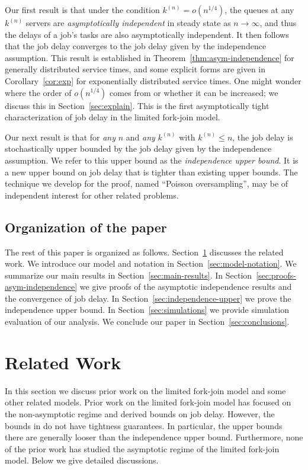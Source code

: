 \documentclass[sigconf]{acmart}
\newcommand{\supn}{^{(n)}}
\begin{document}
Our first result is that under the condition $k\supn=o(n^{1/4})$, the queues at any $k\supn$ servers are \emph{asymptotically independent} in steady state as $n\to\infty$, and thus the delays of a job's tasks are also asymptotically independent.  It then follows that the job delay converges to the job delay given by the independence assumption.  This result is established in Theorem~\ref{thm:asym-independence} for generally distributed service times, and some explicit forms are given in Corollary~\ref{cor:exp} for exponentially distributed service times.  One might wonder where the order of $o(n^{1/4})$ comes from or whether it can be increased; we discuss this in Section~\ref{sec:explain}.  This is the first asymptotically tight characterization of job delay in the limited fork-join model.

Our next result is that for \emph{any} $n$ and \emph{any} $k\supn$ with $k\supn\le n$, the job delay is stochastically upper bounded by the job delay given by the independence assumption.  We refer to this upper bound as the \emph{independence upper bound}.  It is a new upper bound on job delay that is tighter than existing upper bounds.  The technique we develop for the proof, named ``Poisson oversampling'', may be of independent interest for other related problems.


\subsection*{\normalsize{Organization of the paper}}
The rest of this paper is organized as follows. Section~\ref{sec:related-work} discusses the related work. We introduce our model and notation in Section~\ref{sec:model-notation}. We summarize our main results in Section~\ref{sec:main-results}. In Section~\ref{sec:proofs-asym-independence} we give proofs of the asymptotic independence results and the convergence of job delay. In Section~\ref{sec:independence-upper} we prove the independence upper bound. In Section~\ref{sec:simulations} we provide simulation evaluation of our analysis. We conclude our paper in Section~\ref{sec:conclusions}.


\section{Related Work}\label{sec:related-work}
In this section we discuss prior work on the limited fork-join model and some other related models.  Prior work on the limited fork-join model \cite{RizPolCiu_16,LeeShaHua_17} has focused on the non-asymptotic regime and derived bounds on job delay.  However, the bounds in \cite{RizPolCiu_16,LeeShaHua_17} do not have tightness guarantees.  In particular, the upper bounds there are generally looser than the independence upper bound.  Furthermore, none of the prior work has studied the asymptotic regime of the limited fork-join model. Below we give detailed discussions.
\end{document}
